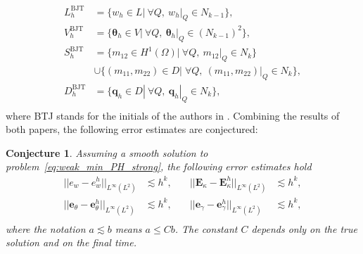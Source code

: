 \documentclass{ifacconf}
\newtheorem{conjecture}{Conjecture}
\begin{document}
\begin{equation}
\label{eq:BTJ}
	\begin{aligned}
	L_h^{\text{BJT}} &= \{w_h \in L | \ \forall Q, \ w_h|_{Q} \in N_{k-1} \}, \\
	V_h^{\text{BJT}} &= \{\bm{\theta}_h \in V | \ \forall Q,\ \bm{\theta}_h|_{Q} \in (N_{k-1})^2 \}, \\
	S_h^{\text{BJT}} &= \{m_{12} \in H^1(\Omega)| \ \forall Q,\ m_{12}|_{Q} \in N_{k} \}  \\
	&\cup \{(m_{11}, m_{22}) \in D| \; \forall Q,\ (m_{11}, m_{22})|_{Q} \in N_{k} \}, \\
	D_h^{\text{BJT}} &= \{\bm{q}_h \in D | \ \forall Q,\ \bm{q}_h|_{Q} \in N_{k} \}, \\ 
	\end{aligned}
\end{equation}
where BTJ stands for the initials of the authors in \cite{becacheWave,becacheElas}. Combining the results of both papers, the following error estimates are conjectured:
\begin{conjecture}
Assuming a smooth solution to problem~\eqref{eq:weak_min_PH_strong}, the following error estimates hold 
\begin{equation}
\label{eq:errBEC}
\begin{aligned}
||e_w - e_w^h||_{L^{\infty}(L^2)} &\lesssim h^{k}, \\
||\bm{e}_\theta - \bm{e}_\theta^h||_{L^{\infty}(L^2)} &\lesssim h^{k}, \\
\end{aligned} \quad
\begin{aligned}
||\bm{E}_\kappa - \bm{E}_\kappa^h||_{L^{\infty}(L^2)} &\lesssim  h^{k}, \\
||\bm{e}_\gamma - \bm{e}_\gamma^ h||_{L^{\infty}(L^2)} &\lesssim  h^{k}, \\
\end{aligned} 
\end{equation}
where the notation $a \lesssim  b$ means $a \le C b$. The constant $C$ depends only on the true solution and on the final time.
\end{conjecture}
\end{document}

